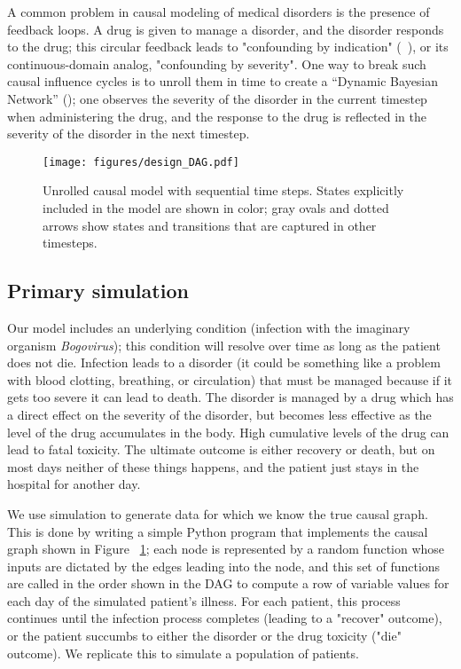 

A common problem in causal modeling of medical disorders is the presence of feedback loops. A drug is given to manage a disorder, and the disorder responds to the drug; this circular feedback leads to "confounding by indication" (~\cite{salas1999confounding}), or its continuous-domain analog, "confounding by severity". One way to break such causal influence cycles is to unroll them in time to create a ``Dynamic Bayesian Network'' (\cite{dean1991planning}); one observes the severity of the disorder in the current timestep when administering the drug, and the response to the drug is reflected in the severity of the disorder in the next timestep.

\begin{figure}
  \centering
  \texttt{[image: figures/design\_DAG.pdf]}
  \caption{Unrolled causal model with sequential time steps. States explicitly included in the model are shown in color; gray ovals and dotted arrows show states and transitions that are captured in other timesteps.}
  \label{fig:HBS_sequence}
\end{figure}

\subsection{Primary simulation}

Our model includes an underlying condition (infection with the imaginary organism \textit{Bogovirus}); this condition will resolve over time as long as the patient does not die. Infection leads to a disorder (it could be something like a problem with blood clotting, breathing, or circulation) that must be managed because if it gets too severe it can lead to death. The disorder is managed by a drug which has a direct effect on the severity of the disorder, but becomes less effective as the level of the drug accumulates in the body. High cumulative levels of the drug can lead to fatal toxicity. The ultimate outcome is either recovery or death, but on most days neither of these things happens, and the patient just stays in the hospital for another day.


We use simulation to generate data for which we know the true causal graph. This is done by writing a simple Python program that implements the causal graph shown in Figure ~\ref{fig:HBS_sequence}; each node is represented by a random function whose inputs are dictated by the edges leading into the node, and this set of functions are called in the order shown in the DAG to compute a row of variable values for each day of the simulated patient's illness. For each patient, this process continues until the infection process completes (leading to a "recover" outcome), or the patient succumbs to either the disorder or the drug toxicity ("die" outcome). We replicate this to simulate a population of patients.

